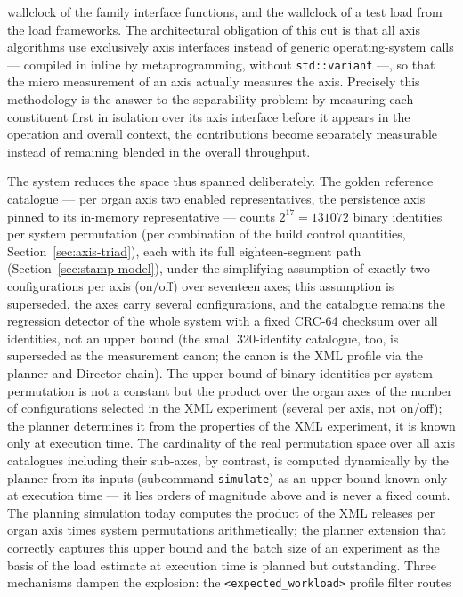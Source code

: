 \begin{nurlang}
wallclock of the family interface functions, and the wallclock of a test load from the
load frameworks. The architectural obligation of this cut is that all axis algorithms
use exclusively axis interfaces instead of generic operating-system calls --- compiled in inline by
metaprogramming, without \texttt{std::variant} ---, so that the micro measurement of
an axis actually measures the axis. Precisely this methodology is the answer to the
separability problem: by measuring each constituent first in isolation over its axis interface
before it appears in the operation and overall context, the contributions become separately
measurable instead of remaining blended in the overall throughput.

The system reduces the space thus spanned deliberately. The golden reference catalogue --- per organ axis
two enabled representatives, the persistence axis pinned to its in-memory representative --- counts
$2^{17} = 131072$ binary identities per system permutation (per combination of the build control quantities,
Section~\ref{sec:axis-triad}), each with its full eighteen-segment path (Section~\ref{sec:stamp-model}),
under the simplifying assumption of exactly two configurations per axis (on/off) over seventeen axes; this
assumption is superseded, the axes carry several configurations, and the catalogue remains the regression
detector of the whole system with a fixed CRC-64 checksum over all identities, not an upper bound (the small
320-identity catalogue, too, is superseded as the measurement canon; the canon is the XML profile via the
planner and Director chain). The upper bound of binary identities per system permutation is not a constant
but the product over the organ axes of the number of configurations selected in the XML experiment (several
per axis, not on/off); the planner determines it from the properties of the XML experiment, it is known only
at execution time. The cardinality of the real permutation space over all axis catalogues including their
sub-axes, by contrast, is computed dynamically by the planner from its inputs (subcommand \texttt{simulate})
as an upper bound known only at execution time --- it lies orders of magnitude above and is never a fixed
count. The planning simulation today computes the product of the XML releases per organ axis times system
permutations arithmetically; the planner extension that correctly captures this upper bound and the batch
size of an experiment as the basis of the load estimate at execution time is planned but outstanding. Three mechanisms dampen the explosion: the \texttt{<expected\_workload>} profile filter routes

\end{nurlang}
